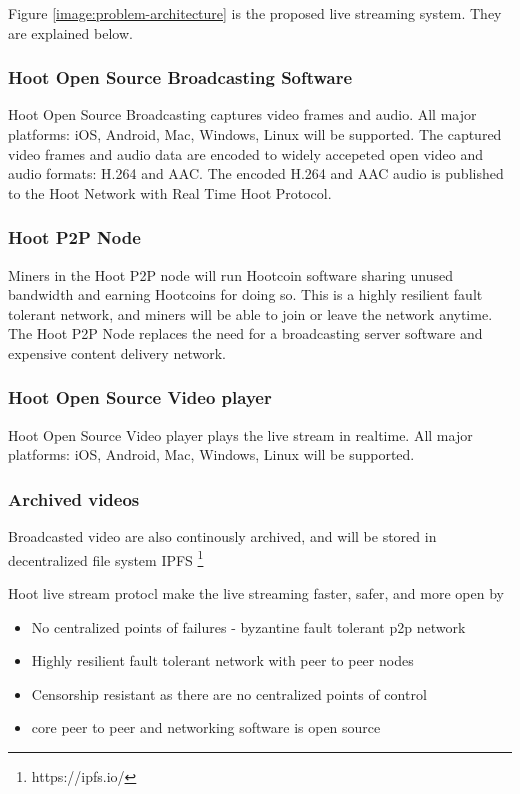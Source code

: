 \documentclass{article}
\begin{document}
Figure \ref{image:problem-architecture} is the proposed live streaming system. They are explained below.
\subsubsection{Hoot Open Source Broadcasting Software}
Hoot Open Source Broadcasting captures video frames and audio. All major platforms: iOS, Android, Mac, Windows, Linux will be supported. The captured video frames and audio data are encoded to widely accepeted open video and audio formats: H.264 and AAC. The encoded H.264 and AAC audio is published to the Hoot Network with Real Time Hoot Protocol.

\subsubsection{Hoot P2P Node}
Miners in the Hoot P2P node will run Hootcoin software sharing unused bandwidth and earning Hootcoins for doing so. This is a highly resilient fault tolerant network, and miners will be able to join or leave the network anytime. The Hoot P2P Node replaces the need for a broadcasting server software and expensive content delivery network.

\subsubsection{Hoot Open Source Video player}
Hoot Open Source Video player plays the live stream in realtime. All major platforms: iOS, Android, Mac, Windows, Linux will be supported.

\subsubsection{Archived videos}
Broadcasted video are also continously archived, and will be stored in decentralized file system IPFS \footnote{https://ipfs.io/}

Hoot live stream protocl make the live streaming faster, safer, and more open by

\begin{itemize}
  \item{No centralized points of failures - byzantine fault tolerant p2p network}
  \item{Highly resilient fault tolerant network with peer to peer nodes}
  \item{Censorship resistant as there are no centralized points of control}
  \item{core peer to peer and networking software is open source}
\end{itemize}
\end{document}
